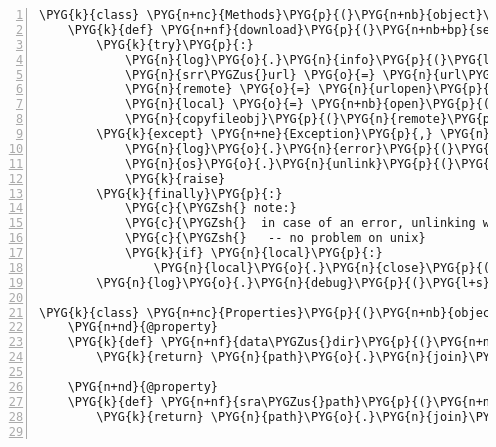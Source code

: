 \begin{Verbatim}[commandchars=\\\{\},numbers=left,firstnumber=1,stepnumber=5]
\PYG{k}{class} \PYG{n+nc}{Methods}\PYG{p}{(}\PYG{n+nb}{object}\PYG{p}{)}\PYG{p}{:}
    \PYG{k}{def} \PYG{n+nf}{download}\PYG{p}{(}\PYG{n+nb+bp}{self}\PYG{p}{)}\PYG{p}{:}
        \PYG{k}{try}\PYG{p}{:}
            \PYG{n}{log}\PYG{o}{.}\PYG{n}{info}\PYG{p}{(}\PYG{l+s}{"}\PYG{l+s}{fetching }\PYG{l+s}{"} \PYG{o}{+} \PYG{n+nb+bp}{self}\PYG{o}{.}\PYG{n}{srr}\PYG{p}{)}
            \PYG{n}{srr\PYGZus{}url} \PYG{o}{=} \PYG{n}{url\PYGZus{}template}\PYG{o}{.}\PYG{n}{format}\PYG{p}{(}\PYG{n}{srr}\PYG{o}{=}\PYG{n+nb+bp}{self}\PYG{o}{.}\PYG{n}{srr}\PYG{p}{)}
            \PYG{n}{remote} \PYG{o}{=} \PYG{n}{urlopen}\PYG{p}{(}\PYG{n}{srr\PYGZus{}url}\PYG{p}{,} \PYG{n}{timeout}\PYG{o}{=}\PYG{l+m+mi}{60}\PYG{p}{)}
            \PYG{n}{local} \PYG{o}{=} \PYG{n+nb}{open}\PYG{p}{(}\PYG{n+nb+bp}{self}\PYG{o}{.}\PYG{n}{sra\PYGZus{}path}\PYG{p}{,} \PYG{l+s}{"}\PYG{l+s}{w}\PYG{l+s}{"}\PYG{p}{)}
            \PYG{n}{copyfileobj}\PYG{p}{(}\PYG{n}{remote}\PYG{p}{,} \PYG{n}{local}\PYG{p}{)}
        \PYG{k}{except} \PYG{n+ne}{Exception}\PYG{p}{,} \PYG{n}{e}\PYG{p}{:}
            \PYG{n}{log}\PYG{o}{.}\PYG{n}{error}\PYG{p}{(}\PYG{l+s}{"}\PYG{l+s}{Error fetching SRR: }\PYG{l+s+si}{\PYGZpc{}r}\PYG{l+s}{"} \PYG{o}{\PYGZpc{}} \PYG{n}{e}\PYG{p}{)}
            \PYG{n}{os}\PYG{o}{.}\PYG{n}{unlink}\PYG{p}{(}\PYG{n+nb+bp}{self}\PYG{o}{.}\PYG{n}{sra\PYGZus{}path}\PYG{p}{)}
            \PYG{k}{raise}
        \PYG{k}{finally}\PYG{p}{:}
            \PYG{c}{\PYGZsh{} note:}
            \PYG{c}{\PYGZsh{}  in case of an error, unlinking wil precede closing}
            \PYG{c}{\PYGZsh{}   -- no problem on unix}
            \PYG{k}{if} \PYG{n}{local}\PYG{p}{:}
                \PYG{n}{local}\PYG{o}{.}\PYG{n}{close}\PYG{p}{(}\PYG{p}{)}
        \PYG{n}{log}\PYG{o}{.}\PYG{n}{debug}\PYG{p}{(}\PYG{l+s}{"}\PYG{l+s}{done}\PYG{l+s}{"}\PYG{p}{)}

\PYG{k}{class} \PYG{n+nc}{Properties}\PYG{p}{(}\PYG{n+nb}{object}\PYG{p}{)}\PYG{p}{:}
    \PYG{n+nd}{@property}
    \PYG{k}{def} \PYG{n+nf}{data\PYGZus{}dir}\PYG{p}{(}\PYG{n+nb+bp}{self}\PYG{p}{)}\PYG{p}{:}
        \PYG{k}{return} \PYG{n}{path}\PYG{o}{.}\PYG{n}{join}\PYG{p}{(}\PYG{n}{rnaseqlyze}\PYG{o}{.}\PYG{n}{shared\PYGZus{}data\PYGZus{}path}\PYG{p}{,} \PYG{n+nb+bp}{self}\PYG{o}{.}\PYG{n}{srr}\PYG{p}{)}

    \PYG{n+nd}{@property}
    \PYG{k}{def} \PYG{n+nf}{sra\PYGZus{}path}\PYG{p}{(}\PYG{n+nb+bp}{self}\PYG{p}{)}\PYG{p}{:}
        \PYG{k}{return} \PYG{n}{path}\PYG{o}{.}\PYG{n}{join}\PYG{p}{(}\PYG{n+nb+bp}{self}\PYG{o}{.}\PYG{n}{data\PYGZus{}dir}\PYG{p}{,} \PYG{n+nb+bp}{self}\PYG{o}{.}\PYG{n}{sra\PYGZus{}name}\PYG{p}{)}


\end{Verbatim}
